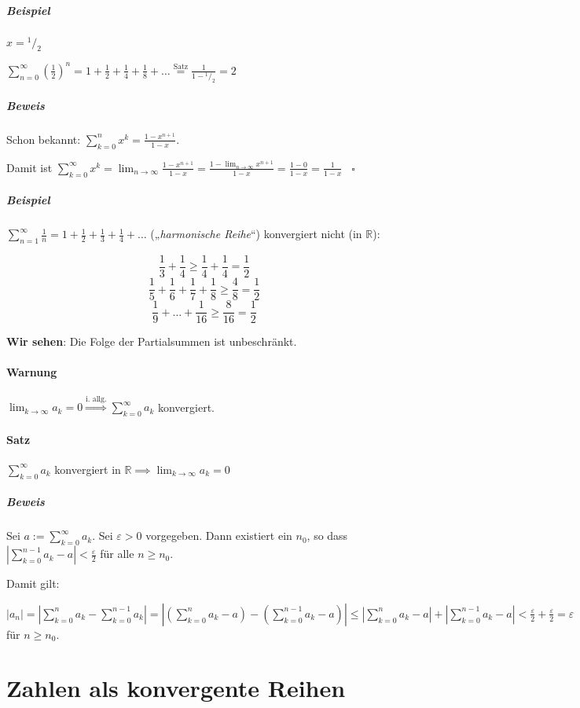 \documentclass[14pt,a4paper]{article}
\newcommand*\rfrac[2]{{}^{#1}\!/_{#2}}
\begin{document}
  \subparagraph{Beispiel}
  $x = \rfrac{1}{2}$

  $\sum_{n=0}^\infty (\frac{1}{2})^n = 1 + \frac{1}{2} + \frac{1}{4} +
  \frac{1}{8} + \ldots \stackrel{\text{Satz}}{=} \frac{1}{1 - \rfrac{1}{2}} = 2$

  \subparagraph{Beweis}
  Schon bekannt: $ \sum_{k=0}^n x^k = \frac{1-x^{n+1}}{1-x} $.\par
  Damit ist $ \sum_{k=0}^{\infty} x^k = \lim_{n \to \infty} \frac{1-x^{n+1}}{1 -
  x} = \frac{1 - \lim_{n\to\infty}x^{n+1}}{1-x} = \frac{1-0}{1-x} =
  \frac{1}{1-x} \;\;\; \square$

  \subparagraph{Beispiel}
  $ \sum_{n = 1}^\infty \frac{1}{n} = 1 + \frac{1}{2} + \frac{1}{3} + \frac{1}{4}
  + \ldots $ („\textit{harmonische Reihe}“) konvergiert nicht (in $\mathbb{R}$):
  
  $$ \frac{1}{3} + \frac{1}{4} \geq \frac{1}{4} + \frac{1}{4} = \frac{1}{2} $$
  $$ \frac{1}{5} + \frac{1}{6} + \frac{1}{7} + \frac{1}{8} \geq \frac{4}{8} =
  \frac{1}{2} $$
  $$ \frac{1}{9} + \ldots + \frac{1}{16} \geq \frac{8}{16} = \frac{1}{2} $$

  \textbf{Wir sehen}: Die Folge der Partialsummen ist unbeschränkt.

  \paragraph{Warnung}
  $ \lim_{k \to \infty} a_k = 0 \stackrel{\text{i. allg.}}{\Rightarrow}
  \sum_{k=0}^\infty a_k$ konvergiert.

  \paragraph{Satz}
  $ \sum_{k=0}^\infty a_k$ konvergiert in $\mathbb{R} \implies \lim_{k \to
    \infty} a_k = 0$

  \subparagraph{Beweis}
  Sei $ a := \sum_{k=0}^\infty a_k$. Sei $ \varepsilon > 0 $ vorgegeben.
  Dann existiert ein $n_0$, so dass $ | \sum_{k=0}^{n-1} a_k -a | <
  \frac{\varepsilon}{2} $ für alle $ n \geq n_0$.

  Damit gilt:
  
  $ | a_n | = | \sum_{k = 0}^n a_k - \sum_{k=0}^{n-1} a_k | = | (\sum_{k=0}^n
  a_k - a) - (\sum_{k=0}^{n-1} a_k - a) | \leq |\sum_{k=0}^n a_k - a| + |\sum_{k=0}^{n-1} a_k - a| < \frac{\varepsilon}{2} +
  \frac{\varepsilon}{2} = \varepsilon $ für $n \geq n_0$.

  \section{Zahlen als konvergente Reihen}
  
\end{document}
